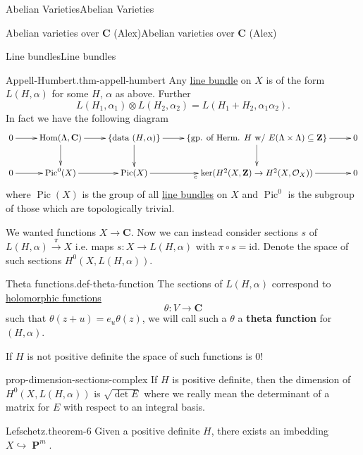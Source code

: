 \documentclass[10pt,]{book}
\newcommand{\terminology}[1]{\textbf{#1}}
\numberwithin{equation}{section}
\newcommand{\sheaf}[1]{\operatorname{\mathcal{#1}}}
\newcommand{\ZZ}{\mathbf{Z}}
\newcommand{\CC}{\mathbf{C}}
\newcommand{\id}{\mathrm{id}}
\DeclareMathOperator{\Hom}{Hom}
\DeclareMathOperator{\Pic}{Pic}
\DeclareMathOperator{\PP}{\mathbf{P}}
\begin{document}
\begin{chapterptx}{Abelian Varieties}{}{Abelian Varieties}{}{}
\begin{sectionptx}{Abelian varieties over \(\CC\) (Alex)}{}{Abelian varieties over \(\CC\) (Alex)}{}{}
\begin{subsectionptx}{Line bundles}{}{Line bundles}{}{}
\begin{theorem}{Appell-Humbert.}{}{thm-appell-humbert}%
\hypertarget{p-60}{}%
Any \hyperref[def-line-bundle]{line bundle} on \(X\) is of the form \(L(H,\alpha)\) for some \(H\), \(\alpha\) as above. Further%
\begin{equation*}
L(H_1, \alpha_1) \otimes L(H_2, \alpha_2)  = L(H_1+ H_2, \alpha_1\alpha_2)\text{.}
\end{equation*}
In fact we have the following diagram%
\begin{equation*}
\xymatrix{
0 \ar[r] &
\Hom(\Lambda, \CC) \ar[r]\ar[d] &
\{\text{data } (H,\alpha)\} \ar[r]\ar[d] &
\{\text{gp. of Herm. } H \text{ w/ }E(\Lambda\times \Lambda) \subseteq \ZZ\} \ar[r]\ar[d] &
0 \\
0 \ar[r] &
\Pic^0(X) \ar[r] &
\Pic(X) \ar[r]_c &
\ker(H^2(X,\ZZ) \to H^2(X,\sheaf O_X)) \ar[r]&
0
}
\end{equation*}
where \(\Pic(X)\) is the group of all \hyperref[def-line-bundle]{line bundles} on \(X\) and \(\Pic^0\) is the subgroup of those which are topologically trivial.%
\end{theorem}
\hypertarget{p-61}{}%
We wanted functions \(X\to \CC\). Now we can instead consider sections \(s\) of \(L(H,\alpha) \xrightarrow{\pi} X\) i.e. maps \(s\colon X\to L(H,\alpha)\) with \(\pi\circ s = \id\). Denote the space of such sections \(H^0(X,L(H,\alpha))\).%
\begin{definition}{Theta functions.}{def-theta-function}%
\hypertarget{p-62}{}%
The sections of \(L(H, \alpha)\)  correspond to \hyperref[def-morph-riem-surf]{holomorphic functions}%
\begin{equation*}
\theta \colon V \to \CC
\end{equation*}
such that \(\theta(z+ u) = e_u \theta(z)\), we will call such a \(\theta\) a \terminology{theta function} for \((H,\alpha)\).%
\end{definition}
\hypertarget{p-63}{}%
If \(H\) is not positive definite the space of such functions is 0!%
\begin{proposition}{}{}{prop-dimension-sections-complex}%
\hypertarget{p-64}{}%
If \(H\) is positive definite, then the dimension of \(H^0(X, L(H,\alpha))\) is \(\sqrt{\det E}\) where we really mean the determinant of a matrix for \(E\) with respect to an integral basis.%
\end{proposition}
\begin{theorem}{Lefschetz.}{}{theorem-6}%
\hypertarget{p-65}{}%
Given a positive definite \(H\), there exists an imbedding \(X \hookrightarrow \PP^m\).%

\end{theorem}
\end{subsectionptx}
\end{sectionptx}
\end{chapterptx}
\end{document}
